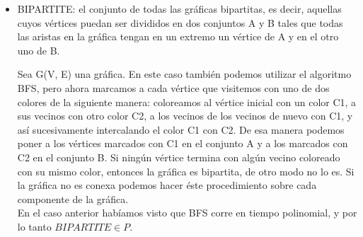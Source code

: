 \documentclass[12pt]{article}
\begin{document}
\begin{itemize}
  \item BIPARTITE: el conjunto de todas las gráficas bipartitas, es decir, aquellas cuyos vértices puedan ser divididos en dos conjuntos A y B tales que todas las aristas en la gráfica tengan en un extremo un vértice de A y en el otro uno de B. 
  
    Sea G(V, E) una gráfica. En este caso también podemos utilizar el algoritmo BFS, pero ahora marcamos a cada vértice que visitemos con uno de dos colores de la siguiente manera: coloreamos al vértice inicial con un color C1, a sus vecinos con otro color C2, a los vecinos de los vecinos de nuevo con C1, y así sucesivamente intercalando el color C1 con C2. De esa manera podemos poner a los vértices marcados con C1 en el conjunto A y a los marcados con C2 en el conjunto B. Si ningún vértice termina con algún vecino coloreado con su mismo color, entonces la gráfica es bipartita, de otro modo no lo es. Si la gráfica no es conexa podemos hacer éste procedimiento sobre cada componente de la gráfica. \\

    En el caso anterior habíamos visto que BFS corre en tiempo polinomial, y por lo tanto $BIPARTITE \in P$.
 \end{itemize}  
\end{document}
